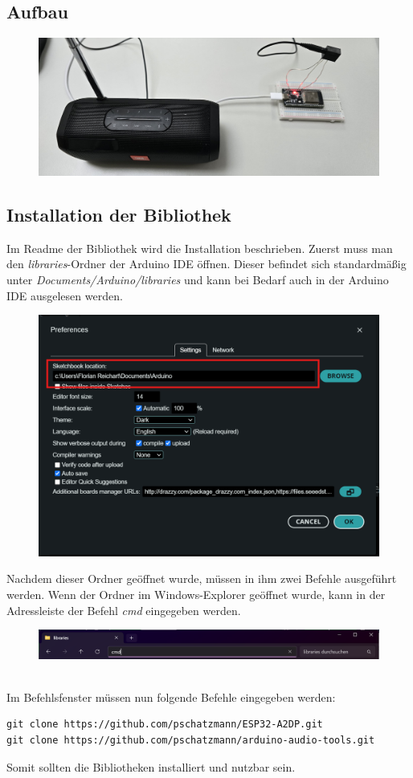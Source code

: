 \documentclass[twoside]{article}
\begin{document}
\subsection{Aufbau}
\begin{figure}[h]
    \centering
    \includegraphics[width=0.9\linewidth]{img/Aufbau_01.jpg}
\end{figure}

\subsection{Installation der Bibliothek}
Im Readme der Bibliothek wird die Installation beschrieben. Zuerst muss man den \textit{libraries}-Ordner der Arduino IDE öffnen. Dieser befindet sich standardmäßig unter \textit{Documents/Arduino/libraries} und kann bei Bedarf auch in der Arduino IDE ausgelesen werden.
\begin{figure}[h]
    \centering
    \includegraphics[width=0.5\linewidth]{img/Arduino_IDE_Pref_01.png}
\end{figure}
Nachdem dieser Ordner geöffnet wurde, müssen in ihm zwei Befehle ausgeführt werden. Wenn der Ordner im Windows-Explorer geöffnet wurde, kann in der Adressleiste der Befehl \textit{cmd} eingegeben werden.
\begin{figure}[h]
    \centering
    \includegraphics[width=1\linewidth]{img/Explorer_01.png}
\end{figure}
\\
Im Befehlsfenster müssen nun folgende Befehle eingegeben werden:
\begin{verbatim}
git clone https://github.com/pschatzmann/ESP32-A2DP.git
git clone https://github.com/pschatzmann/arduino-audio-tools.git
\end{verbatim}
Somit sollten die Bibliotheken installiert und nutzbar sein.
\end{document}
